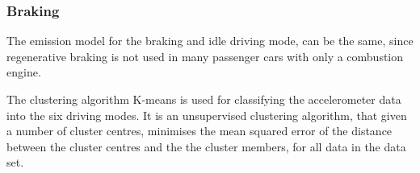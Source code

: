 \subsubsection{Braking}
The emission model for the braking and idle driving mode, can be the same, since regenerative braking is not used in many passenger cars with only a combustion engine.


The clustering algorithm K-means is used for classifying the accelerometer data into the six driving modes. It is an unsupervised clustering algorithm, that given a number of cluster centres, minimises the mean squared error of the distance between the cluster centres and the the cluster members, for all data in the data set. 




 